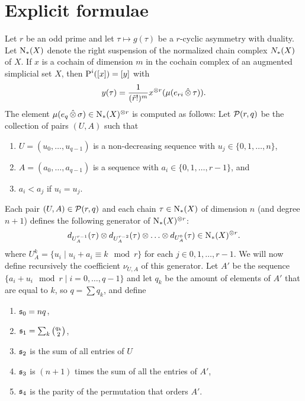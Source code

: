 
\section{Explicit formulae}\label{s:formulas}

Let $r$ be an odd prime and let $\tau\mapsto g(\tau)$ be a $r$-cyclic asymmetry with duality. Let $\operatorname{N}_{*}(X)$ denote the right suspension of the normalized chain complex $N_{*}(X)$ of $X$. If $x$ is a cochain of dimension $m$ in the cochain complex of an augmented simplicial set $X$, then $\operatorname{P}^i([x]) = [y]$ with
\[
	y(\tau) = \frac{1}{(\tilde{r}!)^{m}}x^{\otimes r}(\mu(e_{ri}\operatorname{\hat{\otimes}} \tau)).
\]
The element $\mu(e_{q}\operatorname{\hat{\otimes}} \sigma)\in \operatorname{N}_{*}(X)^{\otimes r}$ is computed as follows: Let $\mathcal{P}(r,q)$ be the collection of pairs $(U,A)$ such that
\renewcommand{\theenumi}{\roman{enumi}}%
\begin{enumerate}
	\item $U = (u_0,\ldots,u_{q-1})$ is a non-decreasing sequence with $u_j\in \{0,1,\ldots,n\}$,
	\item $A = (a_0,\ldots,a_{q-1})$ is a sequence with $a_i\in \{0,1,\ldots,r-1\}$, and
	\item\label{condfor:3} $a_i<a_j$ if $u_i=u_j$.
\end{enumerate}
Each pair $(U,A)\in \mathcal{P}(r,q)$ and each chain $\tau\in \operatorname{N}_{*}(X)$ of dimension $n$ (and degree $n+1$) defines the following generator of $\operatorname{N}_{*}(X)^{\otimes r}$:
\[
	d_{U_A^{r-1}}(\tau)\otimes d_{U_A^{r-2}}(\tau)\otimes \ldots\otimes d_{U_A^{0}}(\tau)\in \operatorname{N}_{*}(X)^{\otimes r}.
\]
where $U_A^k = \{u_i\mid u_i + a_i \equiv k\mod r\}$ for each $j\in 0,1,\ldots,r-1$. We will now define recursively the coefficient $\nu_{U,A}$ of this generator. Let $A'$ be the sequence $\{a_i+u_i\mod r\mid i=0,\ldots,q-1\}$ and let $q_k$ be the amount of elements of $A'$ that are equal to $k$, so $q=\sum q_k$, and define
\renewcommand{\theenumi}{\arabic{enumi}}%
\begin{enumerate}
    \item $\mathfrak{s}_0 = nq$,
	\item $ \mathfrak{s}_1 = \sum_k\binom{q_k}{2}$,
	\item $ \mathfrak{s}_2$ is the sum of all entries of $U$
	\item $ \mathfrak{s}_3$ is $(n+1)$ times the sum of all the entries of $A'$,
	\item $ \mathfrak{s}_4$ is the parity of the permutation that orders $A'$.
\end{enumerate}
